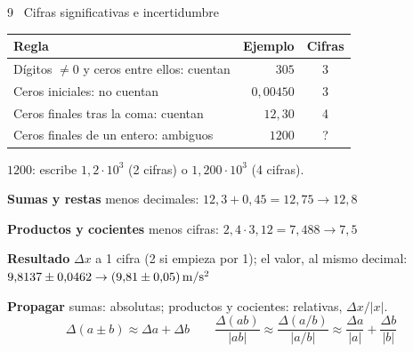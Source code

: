 \documentclass[10pt,a4paper]{article}
\newcommand{\lbl}[1]{\textbf{\textcolor{Ink}{#1}}\enspace}
\begin{document}
\begin{minipage}[t]{0.322\linewidth}
\begin{measbox}{9 \textperiodcentered\ Cifras significativas e incertidumbre}
\begin{tabularx}{\linewidth}{@{}Xrc@{}}
\toprule
Regla & Ejemplo & Cifras\\
\midrule
D\'igitos $\ne0$ y ceros entre ellos: cuentan & $305$ & 3\\
Ceros iniciales: no cuentan & $0{,}00450$ & 3\\
Ceros finales tras la coma: cuentan & $12{,}30$ & 4\\
Ceros finales de un entero: ambiguos & $1200$ & ?\\
\bottomrule
\end{tabularx}\par
$1200$: escribe $1{,}2\cdot10^3$ (2 cifras) o $1{,}200\cdot10^3$ (4 cifras).\par\vspace{0.15em}
\lbl{Sumas y restas} menos decimales: $12{,}3+0{,}45=12{,}75\to12{,}8$\par
\lbl{Productos y cocientes} menos cifras: $2{,}4\cdot3{,}12=7{,}488\to7{,}5$\par
\lbl{Resultado} $\Delta x$ a 1 cifra (2 si empieza por 1); el valor, al mismo decimal:
$9{,}8137\pm0{,}0462\to(9{,}81\pm0{,}05)\,\mathrm{m/s^2}$\par
\lbl{Propagar} sumas: absolutas; productos y cocientes: relativas, $\Delta x/|x|$.
\vspace{-0.1em}
\[
\Delta(a\pm b)\approx\Delta a+\Delta b\qquad
\frac{\Delta(ab)}{|ab|}\approx\frac{\Delta(a/b)}{|a/b|}\approx\frac{\Delta a}{|a|}+\frac{\Delta b}{|b|}
\]
\end{measbox}
\end{minipage}
\end{document}

